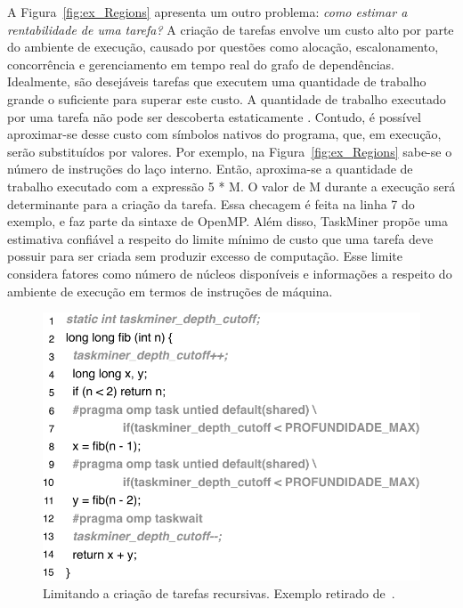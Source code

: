 \documentclass[sigplan,10pt]{acmart}
\newcommand\Taskminer{\mbox{\textsf{TaskMiner}}}
\begin{document}
A Figura~\ref{fig:ex_Regions} apresenta um outro problema: {\em como estimar a rentabilidade de uma tarefa?}
A criação de tarefas envolve um custo alto por parte do ambiente de execução, causado por questões como
alocação, escalonamento, concorrência e gerenciamento em tempo real do grafo de dependências.
Idealmente, são desejáveis tarefas que executem uma quantidade de trabalho
grande o suficiente para superar este custo. A quantidade de trabalho executado
por uma tarefa não pode ser descoberta estaticamente \cite{Rice53}. Contudo,
é possível aproximar-se desse custo com
símbolos nativos do programa, que, em execução, serão substituídos por valores. 
Por exemplo, na Figura~\ref{fig:ex_Regions}
sabe-se o número de instruções do laço interno. Então, aproxima-se a quantidade de trabalho executado
com a expressão \textsf{5 * M}. O valor de \textsf{M} durante a execução será determinante para
a criação da tarefa. Essa checagem é feita na linha 7 do exemplo, 
e faz parte da sintaxe de OpenMP. Além disso, {\Taskminer} propõe
uma estimativa confiável a respeito do limite mínimo de custo 
que uma tarefa deve possuir para ser criada sem produzir
excesso de computação. Esse limite considera fatores como número de 
núcleos disponíveis e informações a respeito do ambiente
de execução em termos de instruções de máquina.
	
\begin{figure}[h!]
\begin{center}
\includegraphics[width=1\columnwidth]{images/ex_cutoff}
\caption{Limitando a criação de tarefas recursivas.
Exemplo retirado de~\cite[Fig.1]{Iwasaki16}.}
\label{fig:ex_cutoff}
\end{center}
\end{figure}
	
\end{document}
